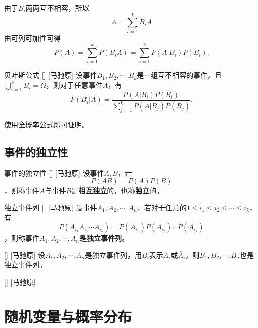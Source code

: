 \documentclass[UTF8]{ctexart}
\begin{document}
        \begin{prf}
            由于$B_i$两两互不相容，所以\[A=\sum_{i=1}^{k}B_iA\]
            由可列可加性可得\[P(A)=\sum_{i=1}^{k}P(B_iA)=\sum_{i=1}^{k}P(A|B_i)P(B_i).\]
        \end{prf}

        \begin{thm}
            []
            {贝叶斯公式}
            []
            [马驰原]
            设事件$B_1,B_2,\cdots,B_k$是一组互不相容的事件，且$\bigcup_{i=1}^{k}B_i=\Omega$，则对于任意事件$A$，有\[P(B_i|A)=\frac{P(A|B_i)P(B_i)}{\sum_{j=1}^{k}P(A|B_j)P(B_j)}.\]
        \end{thm}

        \begin{prf}
            使用全概率公式即可证明。
        \end{prf}

    \subsection{事件的独立性}

        \begin{dfn}
            []
            {事件的独立性}
            []
            [马驰原]
            设事件$A,B$，若\[P(AB)=P(A)P(B)\]，则称事件$A$与事件$B$是\textbf{相互独立}的，也称\textbf{独立}的。
        \end{dfn}

        \begin{dfn}
            []
            {独立事件列}
            []
            [马驰原]
            设事件$A_1,A_2,\cdots,A_n$，若对于任意的$1\leq i_1\leq i_2\leq\cdots\leq i_k$，有\[P(A_{i_1}A_{i_2}\cdots A_{i_k})=P(A_{i_1})P(A_{i_2})\cdots P(A_{i_k})\]，则称事件$A_1,A_2,\cdots,A_n$是\textbf{独立事件列}。
        \end{dfn}

        \begin{ppt}
            []
            {}
            []
            [马驰原]
            设$A_1,A_2,\cdots,A_n$是独立事件列，用$B_i$表示$A_i$或$\bar{A}_i$，则$B_1,B_2,\cdots,B_n$也是独立事件列。
        \end{ppt}

        \begin{ppt}
            []
            {}
            []
            [马驰原]
        \end{ppt}

\section{随机变量与概率分布}
\end{document}
